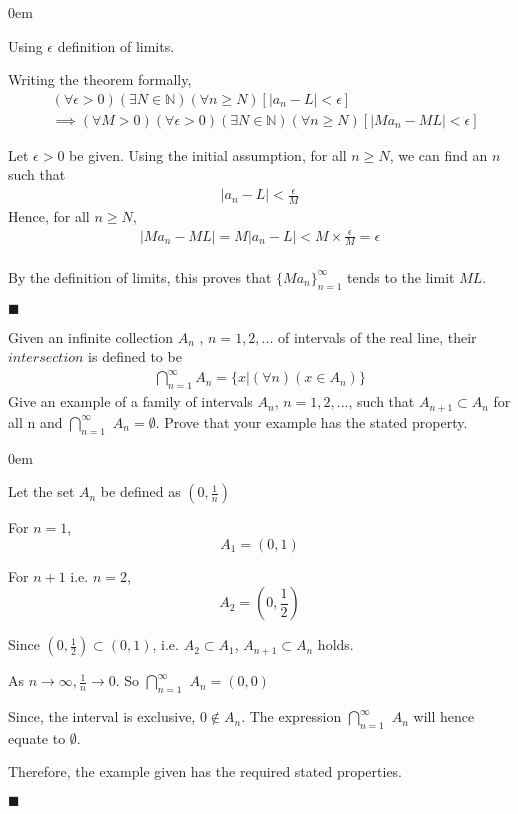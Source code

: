 \documentclass[12pt]{article}
\newcommand{\N}{\mathbb{N}}
\renewcommand{\qed}{\hfill$\blacksquare$}
\renewenvironment{proof}{\begin{addmargin}[1em]{0em}\begin{newproof}}{\end{newproof}\end{addmargin}\qed}
\newenvironment{problem}[2][Problem]{\begin{trivlist}
\item[\hskip \labelsep {\bfseries #1}\hskip \labelsep {\bfseries #2.}]}{\end{trivlist}}
\begin{document}
\begin{proof}
Using $\epsilon$ definition of limits.

Writing the theorem formally,
\begin{align*}
    &(\forall \epsilon > 0)(\exists N \in \N)(\forall n \geq N)[|a_n - L| < \epsilon] \\
    &\implies (\forall M > 0)(\forall \epsilon > 0)(\exists N \in \N)(\forall n \geq N)[|Ma_n - ML| < \epsilon]
\end{align*}

Let $\epsilon > 0$ be given. Using the initial assumption, for all $n \geq N$, we can find an $n$ such that
\begin{align*}
    |a_n - L| < \frac{\epsilon}{M}
\end{align*}
Hence, for all $n \geq N$,
\begin{align*}
    |Ma_n - ML| = M|a_n - L| < M \times \frac{\epsilon}{M} = \epsilon
\end{align*} \\
By the definition of limits, this proves that $\{Ma_n\}_{n=1}^{\infty}$ tends to the limit $ML$.
\end{proof}

\pagebreak


\begin{problem}{9}
    Given an infinite collection $A_n$ , $n=1,2,...$ of intervals of the real line, their $intersection$ is defined to be
    \begin{align*}
        \bigcap\limits_{n=1}^{\infty} A_{n} = \{x|(\forall n)(x \in A_{n})\}
    \end{align*}
    Give an example of a family of intervals $A_n$, $n = 1,2,...$, such that $A_{n+1} \subset A_n$ for all n and ${\bigcap\limits}_{n=1}^{\infty}$ $A_n = \emptyset$. Prove that your example has the stated property.
\end{problem}

\begin{proof}
Let the set $A_n$ be defined as $(0, \frac{1}{n})$

For $n=1$,
$$
A_1 = (0,1)
$$

For $n+1$ i.e. $n=2$,
$$
A_2 = (0,\frac{1}{2})
$$

Since $(0,\frac{1}{2}) \subset (0,1)$, i.e. $A_2 \subset A_1$, $A_{n+1} \subset A_n$ holds.

\hfill \break
As $n\to\infty, \frac{1}{n}\to0$. So ${\bigcap\limits}_{n=1}^{\infty}$ $A_n = (0,0)$

Since, the interval is exclusive, $0 \notin A_n$. The expression ${\bigcap\limits}_{n=1}^{\infty}$ $A_n$ will hence equate to $\emptyset$.

\hfill \break
Therefore, the example given has the required stated properties.
\end{proof}
\end{document}
